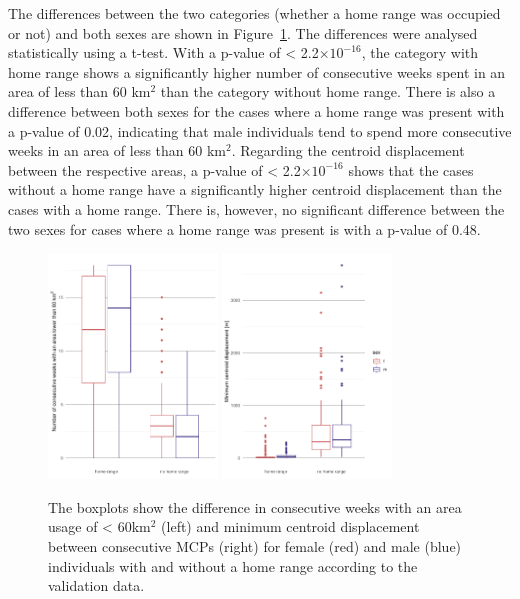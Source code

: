 The differences between the two categories (whether a home range was occupied or not) and both sexes are shown in Figure~\ref{figure:hr_area_centroid_displacement_sex_diff}. The differences were analysed statistically using a t-test. With a p-value of < 2.2$\times10^{-16}$, the category with home range shows a significantly higher number of consecutive weeks spent in an area of less than 60 km$^2$ than the category without home range. There is also a difference between both sexes for the cases where a home range was present with a p-value of 0.02, indicating that male individuals tend to spend more consecutive weeks in an area of less than 60 km$^2$. Regarding the centroid displacement between the respective areas, a p-value of < 2.2$\times10^{-16}$ shows that the cases without a home range have a significantly higher centroid displacement than the cases with a home range. There is, however, no significant difference between the two sexes for cases where a home range was present is with a p-value of 0.48.

\begin{figure}[H]
\centering
\includegraphics[width=0.4\textwidth]{figures/results/02_hr_area_sex_diff_no_legend.pdf}
\includegraphics[width=0.4\textwidth]{figures/results/04_centroid_displacement_sex_diff.pdf}
\caption[Boxplot of birds with and without home range]{The boxplots show the difference in consecutive weeks with an area usage of < 60km$^2$ (left) and minimum centroid displacement between consecutive MCPs (right) for female (red) and male (blue) individuals with and without a home range according to the validation data.}
\label{figure:hr_area_centroid_displacement_sex_diff}
\end{figure} 


